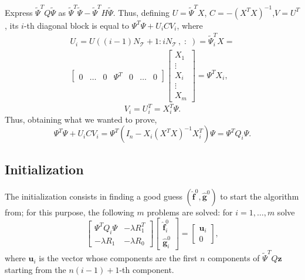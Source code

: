 Express $\tilde{\Psi}^TQ\tilde{\Psi}$ as
$\tilde{\Psi}^T\tilde{\Psi}-\tilde{\Psi}^TH\tilde{\Psi}$. Thus, defining $U =
	\tilde{\Psi}^TX$, $C = -\left(X^TX\right)^{-1}$,$V =U^T$, its $i$-th diagonal
block is equal to $\Psi^T\Psi + U_iCV_i $, where
\begin{equation}
	\begin{split}
		U_i = U\left(\left(i-1\right)N_\mathcal{T}+1 : iN_\mathcal{T}\,, \;:\;\right) = \tilde{\Psi}^T_iX =\\
		\begin{bmatrix}
			0 & \dots & 0 & \Psi^T & 0 & \dots & 0
		\end{bmatrix}
		\begin{bmatrix}
			X_1    \\
			\vdots \\
			X_i    \\
			\vdots \\
			X_m
		\end{bmatrix}
		= \Psi^T X_i,
	\end{split}
\end{equation}
\begin{equation}
	V_i = U_i^T = X^T_i\Psi.
\end{equation}
Thus, obtaining what we wanted to prove,
\begin{equation}
	\Psi^T\Psi +  U_iCV_i = \Psi^T \left( I_n-X_i\left(X^TX\right)^{-1}X_i^T \right) \Psi = \Psi^T Q_i \Psi.
\end{equation}

\subsection{Initialization}
The initialization consists in finding a good guess
$(\hat{\bm{f}}^0,\hat{\bm{g}}^0)$ to start the algorithm from; for this
purpose, the following $m$ problems are solved: for $i = 1, \dots, m$ solve
\begin{equation}
	\begin{bmatrix}
		\Psi^TQ_i\Psi & -\lambda R_1^T \\
		-\lambda R_1  & -\lambda R_0
	\end{bmatrix}
	\begin{bmatrix}
		\hat{\bm{f}}_i^0 \\
		\hat{\bm{g}}_i^0
	\end{bmatrix}
	=
	\begin{bmatrix}
		\bm{u}_i \\
		0
	\end{bmatrix}
	,
\end{equation}
where $\bm{u}_i$ is the vector whose components are the first $n$
components of $\tilde{\Psi}^T Q\bm{z}$ starting from the $n(i-1) +1$-th
component.

